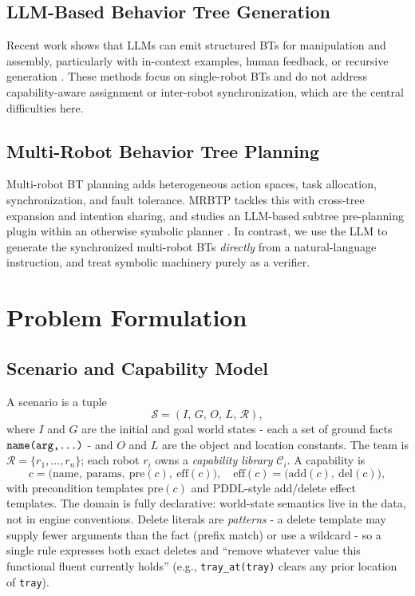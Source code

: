 \documentclass[journal]{IEEEtran}
\newcommand{\pred}[1]{\texttt{#1}}
\begin{document}
\subsection{LLM-Based Behavior Tree Generation}
Recent work shows that LLMs can emit structured BTs for manipulation and assembly, particularly with in-context examples, human feedback, or recursive generation \cite{ao2025llmasbtplanner}. These methods focus on single-robot BTs and do not address capability-aware assignment or inter-robot synchronization, which are the central difficulties here.

\subsection{Multi-Robot Behavior Tree Planning}
Multi-robot BT planning adds heterogeneous action spaces, task allocation, synchronization, and fault tolerance. MRBTP tackles this with cross-tree expansion and intention sharing, and studies an LLM-based subtree pre-planning plugin within an otherwise symbolic planner \cite{cai2025mrbtp}. In contrast, we use the LLM to generate the synchronized multi-robot BTs \emph{directly} from a natural-language instruction, and treat symbolic machinery purely as a verifier.

\section{Problem Formulation}

\subsection{Scenario and Capability Model}
A scenario is a tuple
\begin{equation}
    \mathcal{S} = (I,\, G,\, O,\, L,\, \mathcal{R}),
\end{equation}
where $I$ and $G$ are the initial and goal world states - each a set of ground facts $\pred{name(arg,\dots)}$ - and $O$ and $L$ are the object and location constants. The team is $\mathcal{R}=\{r_1,\dots,r_n\}$; each robot $r_i$ owns a \emph{capability library} $\mathcal{C}_i$. A capability is
\begin{equation}
    c = \big(\text{name},\ \text{params},\ \mathrm{pre}(c),\ \mathrm{eff}(c)\big),\quad
    \mathrm{eff}(c) = \big(\mathrm{add}(c),\ \mathrm{del}(c)\big),
\end{equation}
with precondition templates $\mathrm{pre}(c)$ and PDDL-style add/delete effect templates. The domain is fully declarative: world-state semantics live in the data, not in engine conventions. Delete literals are \emph{patterns} - a delete template may supply fewer arguments than the fact (prefix match) or use a wildcard - so a single rule expresses both exact deletes and ``remove whatever value this functional fluent currently holds'' (e.g., \pred{tray\_at(tray)} clears any prior location of \pred{tray}).
\end{document}

